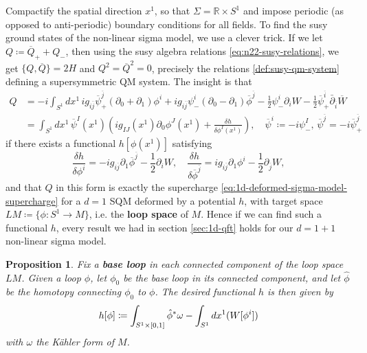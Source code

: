 \documentclass{report}
\theoremstyle{plain}
\newtheorem{proposition}[theorem]{Proposition}
\theoremstyle{definition}
\theoremstyle{remark}
\newcommand{\di}{\partial}
\newcommand{\bR}{\mathbb{R}}
\let\Re\relax
\DeclareMathOperator{\Re}{Re}
\newcommand{\bdi}{\bar{\di}}
\newcommand{\cnj}{\overline}
\begin{document}
Compactify the spatial direction $x^1$, so that $\Sigma = \bR \times
S^1$ and impose periodic (as opposed to anti-periodic) boundary
conditions for all fields. To find the susy ground states of the
non-linear sigma model, we use a clever trick. If we let $Q \coloneqq
\cnj Q_+ + Q_-$, then using the susy algebra relations
\eqref{eq:n22-susy-relations}, we get $\{Q, \cnj Q\} = 2H$ and $Q^2 =
\cnj Q^2 = 0$, precisely the relations \ref{def:susy-qm-system}
defining a supersymmetric QM system. The insight is that
\begin{align*}
  Q &= -i \int_{S^1} dx^1 \, ig_{i\cnj j} \cnj\psi_+^{\cnj j} (\di_0 + \di_1) \phi^i + ig_{i\cnj j} \psi_-^i(\di_0 - \di_1)\cnj\phi^{\cnj j} - \frac{1}{2} \psi_-^i\di_i W - \frac{1}{2} \cnj\psi_+^{\cnj i} \bdi_{\cnj i} \cnj W \\
  &= \int_{S^1} dx^1 \, \cnj\psi^I(x^1)\left(ig_{IJ}(x^1) \di_0 \phi^J(x^1) + \frac{\delta h}{\delta \phi^I(x^1)}\right), \quad \cnj\psi^i \coloneqq -i\psi^I_-, \, \cnj\psi^{\cnj j} = -i\cnj\psi_+^{\cnj j}
\end{align*}
if there exists a functional $h[\phi(x^1)]$ satisfying
\begin{equation} \label{eq:loopspace-sqm-potential-variation}
  \frac{\delta h}{\delta \phi^i} = -ig_{i\cnj j} \di_1 \cnj\phi^{\cnj j} - \frac{1}{2} \di_i W, \quad \frac{\delta h}{\delta \cnj \phi^{\cnj j}} = ig_{i\cnj j} \di_1 \phi^i - \frac{1}{2} \di_{\cnj j} W,
\end{equation}
and that $Q$ in this form is exactly the supercharge
\eqref{eq:1d-deformed-sigma-model-supercharge} for a $d=1$ SQM deformed
by a potential $h$, with target space $LM \coloneqq \{\phi\colon S^1
\to M\}$, i.e. the {\bf loop space} of $M$. Hence if we can find such
a functional $h$, every result we had in section \ref{sec:1d-qft}
holds for our $d=1+1$ non-linear sigma model.

\begin{proposition}
  Fix a {\bf base loop} in each connected component of the loop space
  $LM$. Given a loop $\phi$, let $\phi_0$ be the base loop in its
  connected component, and let $\hat\phi$ be the homotopy connecting
  $\phi_0$ to $\phi$. The desired functional $h$ is then given by
  \[ h[\phi] \coloneqq \int_{S^1 \times [0,1]} \hat\phi^* \omega - \int_{S^1} dx^1 \Re(W[\phi^i]) \]
  with $\omega$ the K\"ahler form of $M$.
\end{proposition}
\end{document}

